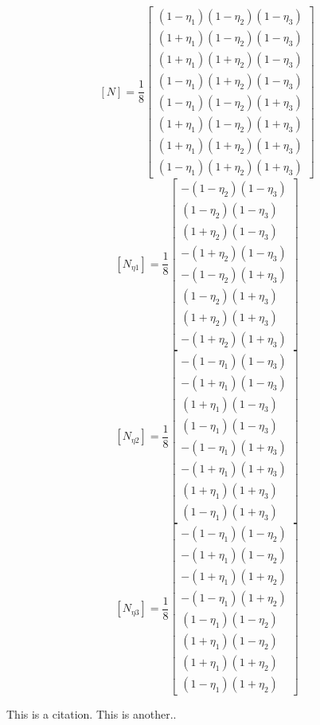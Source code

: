     \[ [N] = \frac{1}{8} \left[ \begin{array}{c}
               (1-\eta_1)(1-\eta_2)(1-\eta_3) \\
               (1+\eta_1)(1-\eta_2)(1-\eta_3) \\
               (1+\eta_1)(1+\eta_2)(1-\eta_3) \\
               (1-\eta_1)(1+\eta_2)(1-\eta_3) \\
               (1-\eta_1)(1-\eta_2)(1+\eta_3) \\
               (1+\eta_1)(1-\eta_2)(1+\eta_3) \\
               (1+\eta_1)(1+\eta_2)(1+\eta_3) \\
               (1-\eta_1)(1+\eta_2)(1+\eta_3)
            \end{array}\right] \]
    \[ [N_{\eta1}] = \frac{1}{8} \left[ \begin{array}{c}
               -(1-\eta_2)(1-\eta_3) \\
                (1-\eta_2)(1-\eta_3) \\
                (1+\eta_2)(1-\eta_3) \\
               -(1+\eta_2)(1-\eta_3) \\
               -(1-\eta_2)(1+\eta_3) \\
                (1-\eta_2)(1+\eta_3) \\
                (1+\eta_2)(1+\eta_3) \\
               -(1+\eta_2)(1+\eta_3)
            \end{array}\right]\]
    \[ [N_{\eta2}] = \frac{1}{8} \left[ \begin{array}{c}
               -(1-\eta_1)(1-\eta_3) \\
               -(1+\eta_1)(1-\eta_3) \\
                (1+\eta_1)(1-\eta_3) \\
                (1-\eta_1)(1-\eta_3) \\
               -(1-\eta_1)(1+\eta_3) \\
               -(1+\eta_1)(1+\eta_3) \\
                (1+\eta_1)(1+\eta_3) \\
                (1-\eta_1)(1+\eta_3)
            \end{array}\right]\]
    \[ [N_{\eta3}] = \frac{1}{8} \left[ \begin{array}{c}
               -(1-\eta_1)(1-\eta_2) \\
               -(1+\eta_1)(1-\eta_2) \\
               -(1+\eta_1)(1+\eta_2) \\
               -(1-\eta_1)(1+\eta_2) \\
                (1-\eta_1)(1-\eta_2) \\
                (1+\eta_1)(1-\eta_2) \\
                (1+\eta_1)(1+\eta_2) \\
                (1-\eta_1)(1+\eta_2)
            \end{array}\right]\]

	This is a citation. \cite{bar}
        This is another.. \cite{colorado16}
        